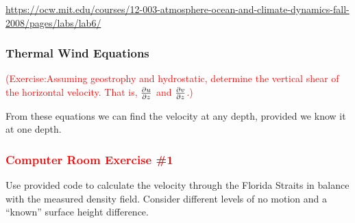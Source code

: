 \documentclass[xcolor=dvipsnames]{beamer}
\begin{document}
\begin{frame}
\url{https://ocw.mit.edu/courses/12-003-atmosphere-ocean-and-climate-dynamics-fall-2008/pages/labs/lab6/}
\end{frame}

\begin{frame}
\frametitle{Thermal Wind Equations}
\textcolor{red}{(Exercise:Assuming geostrophy and hydrostatic, determine the vertical shear of the horizontal velocity.  That is, $\frac {\partial u}{\partial z}$ and $\frac {\partial v}{\partial z}$.)}

From these equations we can find the velocity at any depth, provided we know it at one depth.
\end{frame}

\begin{frame}
\frametitle{\textcolor{red}{Computer Room Exercise \#1}}

 Use provided code to calculate the velocity through the Florida Straits in balance with the measured density field. Consider different levels of no motion and a ``known'' surface height difference.


\end{frame}
\end{document}
